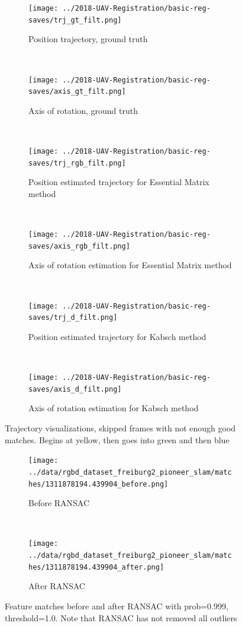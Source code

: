 \documentclass[12pt,a4paper]{article}
\begin{document}
\begin{figure}[p]
  \centering
  \begin{subfigure}[t]{0.5\textwidth}
  \centering
    \texttt{[image: ../2018-UAV-Registration/basic-reg-saves/trj\_gt\_filt.png]}
  \caption{Position trajectory, ground truth}
  \end{subfigure}%
  ~
  \begin{subfigure}[t]{0.5\textwidth}
  \centering
    \texttt{[image: ../2018-UAV-Registration/basic-reg-saves/axis\_gt\_filt.png]}
  \caption{Axis of rotation, ground truth}
  \end{subfigure}
  \\
  \begin{subfigure}[t]{0.5\textwidth}
  \centering
    \texttt{[image: ../2018-UAV-Registration/basic-reg-saves/trj\_rgb\_filt.png]}
  \caption{Position estimated trajectory for Essential Matrix method}
  \end{subfigure}%
  ~
  \begin{subfigure}[t]{0.5\textwidth}
  \centering
    \texttt{[image: ../2018-UAV-Registration/basic-reg-saves/axis\_rgb\_filt.png]}
  \caption{Axis of rotation estimation for Essential Matrix method}
  \end{subfigure}
  \\
  \begin{subfigure}[t]{0.5\textwidth}
  \centering
    \texttt{[image: ../2018-UAV-Registration/basic-reg-saves/trj\_d\_filt.png]}
  \caption{Position estimated trajectory for Kabsch method}
  \end{subfigure}%
  ~
  \begin{subfigure}[t]{0.5\textwidth}
  \centering
    \texttt{[image: ../2018-UAV-Registration/basic-reg-saves/axis\_d\_filt.png]}
  \caption{Axis of rotation estimation for Kabsch method}
  \end{subfigure}
  \caption{Trajectory visualizations, skipped frames with not enough good matches. Begins at yellow, then goes into green and then blue}
  \label{f: D415 offset}
\end{figure}

\newpage
\begin{figure}[t!]
  \centering
  \begin{subfigure}[t]{\textwidth}
  \centering
    \texttt{[image: ../data/rgbd\_dataset\_freiburg2\_pioneer\_slam/matches/1311878194.439904\_before.png]}
  \caption{Before RANSAC}
  \end{subfigure}
  \\
  \begin{subfigure}[t]{\textwidth}
  \centering
    \texttt{[image: ../data/rgbd\_dataset\_freiburg2\_pioneer\_slam/matches/1311878194.439904\_after.png]}
  \caption{After RANSAC}
  \end{subfigure}
  \caption{Feature matches before and after RANSAC with prob=0.999, threshold=1.0. Note that RANSAC has not removed all outliers}
  \label{f: D415 offset}
\end{figure}
\end{document}
